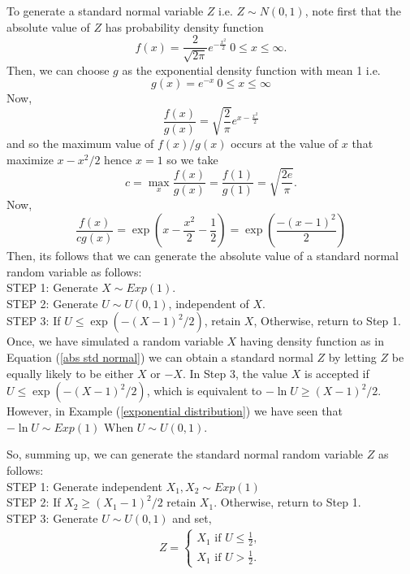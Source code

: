 \begin{example}
	\label{generate normal}
	To generate a standard normal variable $Z$ i.e. $Z\sim N(0,1)$, note first that the absolute value of  $Z$ has probability density function
	\begin{equation}
		\label{abs std normal}
		f(x) = \frac{2}{\sqrt{2\pi}}e^{- \frac{x^{2}}{2}} \ 0\le x \le \infty.
	\end{equation}
	Then, we can choose $g$ as the exponential density function with mean 1 i.e.
	\[
		g(x) = e^{-x}\ 0\le x\le \infty
	\]
	Now,
	\[
		\frac{f(x)}{g(x)} = \sqrt{\frac{2}{\pi}} e^{x-\frac{x^{2}}{2}}
	\]
	and so the maximum value of $f(x)/g(x)$ occurs at the value of $x$ that maximize $x-x^2 /2$ hence $x=1$ so we take
	\[
		c = \max_x \frac{f(x)}{g(x)} = \frac{f(1)}{g(1)} = \sqrt{\frac{2e}{\pi}}.
	\]
	Now,
	\[
		\frac{f(x)}{cg(x)} = \exp\left( x-\frac{x^2}{2}-\frac{1}{2} \right) = \exp\left( \frac{-(x-1)^2}{2} \right)
	\]
	Then, its follows that we can generate the absolute value of a standard normal random variable as follows: \\
	STEP 1: Generate $X\sim Exp(1)$. \\
	STEP 2: Generate $U\sim U(0,1)$, independent of $X$.\\
	STEP 3: If  $U\le \exp\left( -(X-1)^2 /2 \right)$, retain  $X$, Otherwise, return to Step 1.\\

	Once, we have simulated a random variable $X$ having density function as in
	Equation (\ref{abs std normal}) we can obtain a standard normal $Z$ by letting
	$Z$ be equally likely to be either  $X$ or  $-X$.
	In Step 3, the value $X$ is accepted if  $U\le \exp\left( -(X-1)^2 /2 \right)$, which is equivalent to $- \ln U\ge (X-1)^2 /2$.
	However, in Example (\ref{exponential distribution}) we have seen that $-\ln{U}\sim Exp(1)$ When $U\sim U(0,1)$.

	So, summing up, we can generate the standard normal random variable $Z$ as follows:\\
	STEP 1: Generate independent $X_1, X_2\sim Exp(1) $\\
	STEP 2: If $X_2\ge (X_1-1)^2 /2$ retain $X_1$. Otherwise, return to Step 1.\\
	STEP 3: Generate $U\sim U(0,1)$ and set,
	\begin{eqnarray*}
		Z=
		\begin{cases}
			X_1 \text{ if } U\le \frac{1}{2}, \\
			X_1 \text{ if } U> \frac{1}{2}.
		\end{cases}
	\end{eqnarray*}


\end{example}
